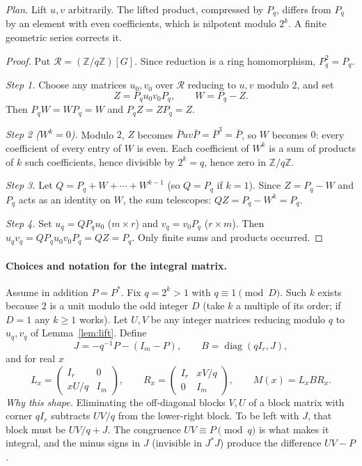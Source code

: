 \documentclass[11pt]{article}
\theoremstyle{remark}
\numberwithin{equation}{section}
\newcommand{\Z}{\mathbb Z}
\newcommand{\diag}{\operatorname{diag}}
\begin{document}
\emph{Plan.} Lift $u,v$ arbitrarily. The lifted product, compressed by $P_q$, differs from $P_q$ by an element with even coefficients, which is nilpotent modulo $2^k$. A finite geometric series corrects it.

\begin{proof}
Put $\mathcal R=(\Z/q\Z)[G]$. Since reduction is a ring homomorphism, $P_q^2=P_q$.

\emph{Step 1.} Choose any matrices $u_0,v_0$ over $\mathcal R$ reducing to $u,v$ modulo $2$, and set
\[
 Z=P_qu_0v_0P_q,\qquad W=P_q-Z .
\]
Then $P_qW=WP_q=W$ and $P_qZ=ZP_q=Z$.

\emph{Step 2 ($W^k=0$).} Modulo $2$, $Z$ becomes $\bar Puv\bar P=\bar P^3=\bar P$, so $W$ becomes $0$: every coefficient of every entry of $W$ is even. Each coefficient of $W^k$ is a sum of products of $k$ such coefficients, hence divisible by $2^k=q$, hence zero in $\Z/q\Z$.

\emph{Step 3.} Let $Q=P_q+W+\cdots+W^{k-1}$ (so $Q=P_q$ if $k=1$). Since $Z=P_q-W$ and $P_q$ acts as an identity on $W$, the sum telescopes: $QZ=P_q-W^k=P_q$.

\emph{Step 4.} Set $u_q=QP_qu_0$ ($m\times r$) and $v_q=v_0P_q$ ($r\times m$). Then $u_qv_q=QP_qu_0v_0P_q=QZ=P_q$. Only finite sums and products occurred.
\end{proof}

\paragraph{Choices and notation for the integral matrix.} Assume in addition $P=P^*$. Fix $q=2^k>1$ with $q\equiv1\pmod D$. Such $k$ exists because $2$ is a unit modulo the odd integer $D$ (take $k$ a multiple of its order; if $D=1$ any $k\ge1$ works). Let $U,V$ be any integer matrices reducing modulo $q$ to $u_q,v_q$ of Lemma~\ref{lem:lift}. Define
\[
 J=-q^{-1}P-(I_m-P),\qquad B=\diag(qI_r,J),
\]
and for real $x$
\[
 L_x=\begin{pmatrix}I_r&0\\xU/q&I_m\end{pmatrix},\qquad
 R_x=\begin{pmatrix}I_r&xV/q\\0&I_m\end{pmatrix},\qquad M(x)=L_xBR_x .
\]
\emph{Why this shape.} Eliminating the off-diagonal blocks $V,U$ of a block matrix with corner $qI_r$ subtracts $UV/q$ from the lower-right block. To be left with $J$, that block must be $UV/q+J$. The congruence $UV\equiv P\pmod q$ is what makes it integral, and the minus signs in $J$ (invisible in $J^*J$) produce the difference $UV-P$.
\end{document}
